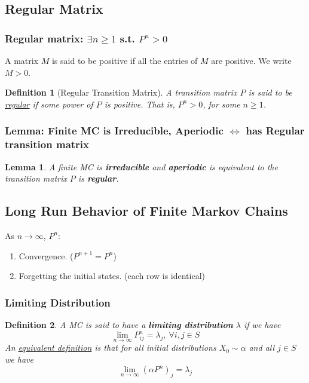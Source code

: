 \documentclass[11pt,a4paper]{article}
\newtheorem{definition}{Definition}
\newtheorem{lemma}{Lemma}
\begin{document}
\subsection{Regular Matrix}
\subsubsection{Regular matrix: $\exists n\geq 1$ s.t. $P^n>0$}
A matrix $M$ is said to be positive if all the entries of $M$ are positive. We write $M > 0$.
\begin{definition}[Regular Transition Matrix]
    A transition matrix $P$ is said to be \underline{regular} if some power of $P$ is positive. That is, $P^n >0$, for some $n\geq 1$.
\end{definition}

\subsubsection{Lemma: Finite MC is Irreducible, Aperiodic $\Leftrightarrow$ has Regular transition matrix}
\begin{lemma}
    A finite MC is \textbf{irreducible} and \textbf{aperiodic} is equivalent to the transition matrix $P$ is \textbf{regular}.
\end{lemma}

\subsection{Long Run Behavior of Finite Markov Chains}
As $n \rightarrow \infty$, $P^n$:
\begin{enumerate}[(1)]
    \item Convergence. ($P^{n+1}=P^n$)
    \item Forgetting the initial states. (each row is identical)
\end{enumerate}

\subsubsection{Limiting Distribution}
\begin{definition}
    A MC is said to have a \textbf{limiting distribution} $\lambda$ if we have $$\lim_{n \rightarrow \infty}P_{ij}^n=\lambda_j,\ \forall i,j\in S$$
    An \underline{equivalent definition} is that for all initial distributions $X_0\sim \alpha$ and all $j\in S$ we have
    $$\lim_{n \rightarrow \infty}(\alpha P^n)_j=\lambda_j$$
\end{definition}
\end{document}
